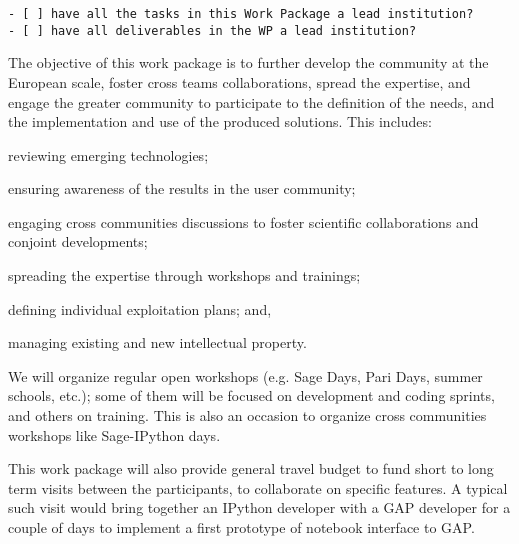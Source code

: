 \begin{draft}
\begin{verbatim}
- [ ] have all the tasks in this Work Package a lead institution?
- [ ] have all deliverables in the WP a lead institution?
\end{verbatim}
\end{draft}



\begin{workpackage}[id=dissem,wphases=18-48!.5,
  short={Community Building/Dissemination},
  title={Community Building, Training, Dissemination, Exploitation, and Outreach},
  lead=PS,
  PSRM=10, %
  SARM=18,
  USORM=10,
  USHRM=8,
  USRM=24,
  UVRM=2,
  UBRM=4,
  SRRM=1
]


\begin{wpobjectives}
  The objective of this work package is to further develop the community at the
  European scale, foster cross teams collaborations, spread the
  expertise, and engage the greater community to participate to the
  definition of the needs, and the implementation and use of the
  produced solutions. This includes:

  \begin{compactitem}
  \item reviewing emerging technologies;
  \item ensuring awareness of the results in the user community;
  \item engaging cross communities discussions to foster scientific collaborations and conjoint developments;
  \item spreading the expertise through workshops and trainings;
  \item defining individual exploitation plans; and,
  \item managing existing and new intellectual property.
  \end{compactitem}
\end{wpobjectives}

\begin{wpdescription} 
  We will organize regular open workshops (e.g. Sage Days, Pari Days,
  summer schools, etc.); some of them will be focused on development
  and coding sprints, and others on training. This is also an occasion
  to organize cross communities workshops like Sage-IPython days.


  This work package will also provide general travel budget to fund
  short to long term visits between the participants, to collaborate
  on specific features. A typical such visit would bring together an
  IPython developer with a GAP developer for a couple of days to
  implement a first prototype of notebook interface to GAP.


\end{wpdescription}
\end{workpackage}

